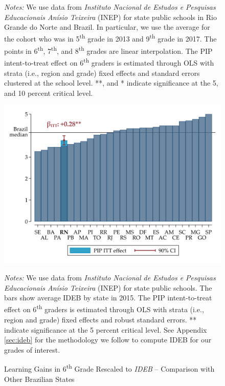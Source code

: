\documentclass[11pt,a4paper]{article}
\begin{document}
\begin{figure}[htbp]
    \begin{minipage}{0.825\textwidth}
        \small{\textit{Notes:} We use data from \textit{Instituto Nacional de Estudos e Pesquisas Educacionais Anísio Teixeira} (INEP) for state public schools in Rio Grande do Norte and Brazil. In particular, we use the average for the cohort who was in 5\textsuperscript{th} grade in 2013 and 9\textsuperscript{th} grade in 2017. The points in 6\textsuperscript{th}, 7\textsuperscript{th}, and 8\textsuperscript{th} grades are linear interpolation. The PIP intent-to-treat effect on 6\textsuperscript{th} graders is estimated through OLS with strata (i.e., region and grade) fixed effects and standard errors clustered at the school level. **, and * indicate significance at the 5, and 10 percent critical level.}
    \end{minipage}
    
\end{figure}

\vfill
\begin{figure}[htbp]

    \centering
    \caption{Learning Gains in 6\textsuperscript{th} Grade Rescaled to \textit{IDEB} -- Comparison with Other Brazilian States}
    
    \includegraphics[width=15cm]{DataWork/Output/Figures/figA6-itt_IDEB.png}
    \label{fig:itt_IDEB}
    
    \begin{minipage}{0.825\textwidth}
        \small{\textit{Notes:} We use data from \textit{Instituto Nacional de Estudos e Pesquisas Educacionais Anísio Teixeira} (INEP) for state public schools. The bars show average IDEB by state in 2015. The PIP intent-to-treat effect on 6\textsuperscript{th} graders is estimated through OLS with strata (i.e., region and grade) fixed effects and robust standard errors. ** indicate significance at the 5 percent critical level. See Appendix \ref{sec:ideb} for the methodology we follow to compute IDEB for our grades of interest.}
    \end{minipage}
    
\end{figure}
\vfill
\end{document}
